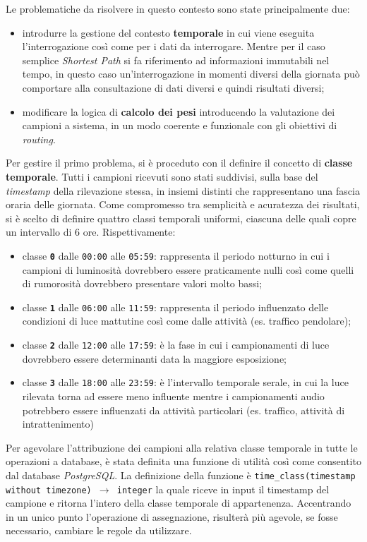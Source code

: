 Le problematiche da risolvere in questo contesto sono state principalmente due:
\begin{itemize}
\item introdurre la gestione del contesto \textbf{temporale} in cui viene eseguita l'interrogazione così come per i dati da interrogare. Mentre per il caso semplice \emph{Shortest Path} si fa riferimento ad informazioni immutabili nel tempo, in questo caso un'interrogazione in momenti diversi della giornata può comportare alla consultazione di dati diversi e quindi risultati diversi;
\item modificare la logica di \textbf{calcolo dei pesi} introducendo la valutazione dei campioni a sistema, in un modo coerente e funzionale con gli obiettivi di \emph{routing}. 
\end{itemize}
Per gestire il primo problema, si è proceduto con il definire il concetto di \textbf{classe temporale}. Tutti i campioni ricevuti sono stati suddivisi, sulla base del \emph{timestamp} della rilevazione stessa, in insiemi distinti che rappresentano una fascia oraria delle giornata. Come compromesso tra semplicità e acuratezza dei risultati, si è scelto di definire quattro classi temporali uniformi, ciascuna delle quali copre un intervallo di 6 ore. Rispettivamente:
\begin{itemize}
\item classe \texttt{\textbf{0}} dalle \texttt{00:00} alle \texttt{05:59}: rappresenta il periodo notturno in cui i campioni di luminosità dovrebbero essere praticamente nulli così come quelli di rumorosità dovrebbero presentare valori molto bassi;
\item classe \texttt{\textbf{1}} dalle \texttt{06:00} alle \texttt{11:59}: rappresenta il periodo influenzato delle condizioni di luce mattutine così come dalle attività (es. traffico pendolare);
\item classe \texttt{\textbf{2}} dalle \texttt{12:00} alle \texttt{17:59}: è la fase in cui i campionamenti di luce dovrebbero essere determinanti data la maggiore esposizione;
\item classe \texttt{\textbf{3}} dalle \texttt{18:00} alle \texttt{23:59}: è l'intervallo temporale serale, in cui la luce rilevata torna ad essere meno influente mentre i campionamenti audio potrebbero essere influenzati da attività particolari (es. traffico, attività di intrattenimento)
\end{itemize}
Per agevolare l'attribuzione dei campioni alla relativa classe temporale in tutte le operazioni a database, è stata definita una funzione di utilità così come consentito dal database \emph{PostgreSQL}. La definizione della funzione è \texttt{time\_class(timestamp without timezone) $\rightarrow$ integer} la quale riceve in input il timestamp del campione e ritorna l'intero della classe temporale di appartenenza. Accentrando in un unico punto l'operazione di assegnazione, risulterà più agevole, se fosse necessario, cambiare le regole da utilizzare. 

